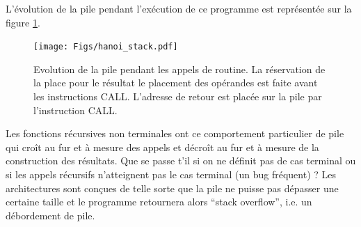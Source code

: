 L'évolution de la pile pendant l'exécution de ce programme est représentée sur la figure \ref{fig:hanoi_stack}.
\begin{figure}[htbp]
\texttt{[image: Figs/hanoi\_stack.pdf]}
\caption{\label{fig:hanoi_stack} Evolution de la pile pendant les appels de routine. La réservation de la place pour le résultat le placement des opérandes est faite avant les instructions CALL. L'adresse de retour est placée sur la pile par l'instruction CALL.}
\end{figure}

Les fonctions récursives non terminales ont ce comportement particulier de pile qui croît au fur et à mesure des appels et décroît au fur et à mesure de la construction des résultats. Que se passe t'il si on ne définit pas de cas terminal ou si les appels récursifs n'atteignent pas le cas terminal (un bug fréquent) ? Les architectures sont conçues de telle sorte que la pile ne puisse pas dépasser une certaine taille et le programme retournera alors ``stack overflow'', i.e. un débordement de pile.









